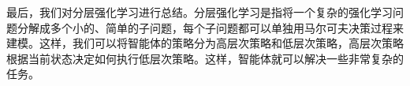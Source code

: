 最后，我们对分层强化学习进行总结。分层强化学习是指将一个复杂的强化学习问题分解成多个小的、简单的子问题，每个子问题都可以单独用马尔可夫决策过程来建模。这样，我们可以将智能体的策略分为高层次策略和低层次策略，高层次策略根据当前状态决定如何执行低层次策略。这样，智能体就可以解决一些非常复杂的任务。












